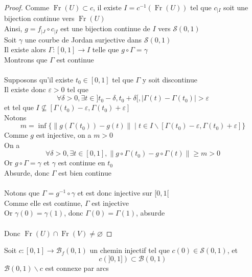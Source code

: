 \documentclass{article}
\begin{document}
\begin{flushleft}
\begin{proof}
    Comme $\operatorname{Fr}(U) \subset c$, il existe $I = c^{-1}(\operatorname{Fr}(U))$ tel que $c_{\mid I}$ soit une bijection continue vers
    $\operatorname{Fr}(U)$\\
    Ainsi, $g = f_{\mid J} \circ c_{\mid I}$ est une bijection continue de $I$ vers $\mathcal{S}(0, 1)$\\
    Soit $\gamma$ une courbe de Jordan surjective dans $\mathcal{S}(0, 1)$\\
    Il existe alors $\Gamma : [0, 1] \rightarrow I$ telle que $g \circ \Gamma = \gamma$\\
    Montrons que $\Gamma$ est continue
    \\~\\
    Supposons qu'il existe $t_0 \in [0, 1]$ tel que $\Gamma$ y soit discontinue\\
    Il existe donc $\varepsilon > 0$ tel que
    \[ \forall \delta > 0, \exists t \in ]t_0-\delta, t_0+\delta[, |\Gamma(t) - \Gamma(t_0)| > \varepsilon \]
    et tel que $I \nsubseteq [\Gamma(t_0)-\varepsilon, \Gamma(t_0)+\varepsilon]$\\
    Notons
    \[ m = \inf \{ \| g(\Gamma(t_0)) - g(t) \| \mid t \in I \backslash [\Gamma(t_0)-\varepsilon, \Gamma(t_0)+\varepsilon] \} \]
    Comme $g$ est injective, on a $m > 0$\\
    On a
    \[ \forall \delta > 0, \exists t \in [0, 1], \| g \circ \Gamma(t_0) - g \circ \Gamma(t) \| \geq m > 0 \]
    Or $g \circ \Gamma = \gamma$ et $\gamma$ est continue en $t_0$\\
    Absurde, donc $\Gamma$ est bien continue
    \\~\\
    Notons que $\Gamma = g^{-1} \circ \gamma$ et est donc injective sur $[0, 1[$\\
    Comme elle est continue, $\Gamma$ est injective\\
    Or $\gamma(0) = \gamma(1)$, donc $\Gamma(0) = \Gamma(1)$, absurde
    \\~\\
    Donc $\operatorname{Fr}(U) \cap \operatorname{Fr}(V) \neq \varnothing$
\end{proof}

\begin{tcolorbox}[colback = purple!20!white, colframe = purple!60!white, title = Lemme de la ficelle]
    Soit $c : [0, 1] \rightarrow \mathcal{B}_f(0, 1)$ un chemin injectif tel que $c(0) \in \mathcal{S}(0, 1)$,
    et
    \[ c(]0, 1]) \subset \mathcal{B}(0, 1) \]
    $\mathcal{B}(0, 1) \backslash c$ est connexe par arcs
\end{tcolorbox}


\end{flushleft}
\end{document}
